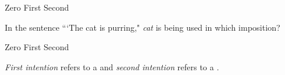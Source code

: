\documentclass[answers]{exam}
\begin{document}
\begin{questions}
      \begin{oneparchoices}
        \choice Zero
        \choice First
        \CorrectChoice Second
      \end{oneparchoices}
      
      \question In the sentence ```The cat is purring," \textit{cat} is being used in which imposition?

      \begin{oneparchoices}
        \choice Zero
        \CorrectChoice First
        \choice Second
      \end{oneparchoices}
      
      \question \textit{First intention} refers to a \fillin[reality] and \textit{second intention} refers to a \fillin[concept].

\end{questions}
\end{document}
